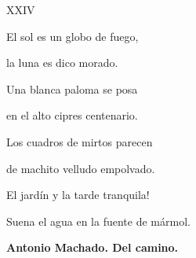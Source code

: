 \begin{figure}[c]
\begin{center}

XXIV

\end{center}

\begin{center}

El sol es un globo de fuego,


la luna es dico morado.


Una blanca paloma se posa


en el alto cipres centenario.


Los cuadros de mirtos parecen


de machito velludo empolvado.


\textexclamdown El jard\'in y la tarde tranquila!


Suena el agua en la fuente de m\'armol.

\end{center}

\begin{center}

\textbf{Antonio Machado. Del camino.}

\end{center}
\end{figure}
